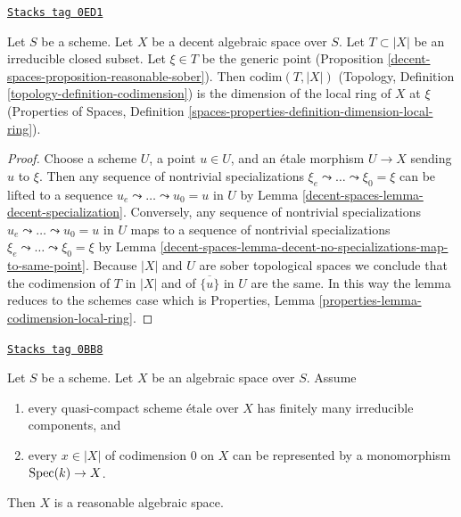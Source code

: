 \begin{lemma}
\label{decent-spaces-lemma-codimension-local-ring}
\href{https://stacks.math.columbia.edu/tag/0ED1}{\texttt{Stacks tag 0ED1}}

Let $S$ be a scheme. Let $X$ be a decent algebraic space over $S$.
Let $T \subset |X|$ be an irreducible closed subset. Let $\xi \in T$
be the generic point (Proposition \ref{decent-spaces-proposition-reasonable-sober}).
Then $\text{codim}(T, |X|)$
(Topology, Definition \ref{topology-definition-codimension})
is the dimension of the local ring of $X$ at $\xi$
(Properties of Spaces, Definition
\ref{spaces-properties-definition-dimension-local-ring}).
\end{lemma}

\begin{proof}
Choose a scheme $U$, a point $u \in U$, and an \'etale morphism
$U \to X$ sending $u$ to $\xi$. Then any sequence of nontrivial
specializations $\xi_e \leadsto \ldots \leadsto \xi_0 = \xi$
can be lifted to a sequence $u_e \leadsto \ldots \leadsto u_0 = u$ in $U$
by Lemma \ref{decent-spaces-lemma-decent-specialization}.
Conversely, any sequence of nontrivial specializations
$u_e \leadsto \ldots \leadsto u_0 = u$ in $U$
maps to a sequence of nontrivial specializations
$\xi_e \leadsto \ldots \leadsto \xi_0 = \xi$ by
Lemma \ref{decent-spaces-lemma-decent-no-specializations-map-to-same-point}.
Because $|X|$ and $U$ are sober topological spaces
we conclude that the codimension of $T$ in $|X|$
and of $\overline{\{u\}}$ in $U$ are the same.
In this way the lemma reduces to the schemes case which
is Properties, Lemma \ref{properties-lemma-codimension-local-ring}.
\end{proof}

\begin{lemma}
\label{decent-spaces-lemma-get-reasonable}
\href{https://stacks.math.columbia.edu/tag/0BB8}{\texttt{Stacks tag 0BB8}}

Let $S$ be a scheme. Let $X$ be an algebraic space over $S$. Assume
\begin{enumerate}
\item every quasi-compact scheme \'etale over $X$ has finitely many
irreducible components, and
\item every $x \in |X|$ of codimension $0$ on $X$ can be represented
by a monomorphism $\operatorname{Spec}(k) \to X$.
\end{enumerate}
Then $X$ is a reasonable algebraic space.
\end{lemma}

